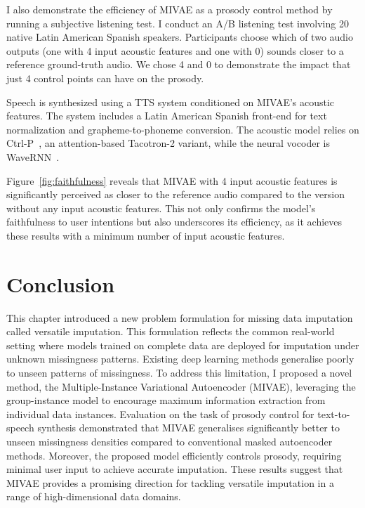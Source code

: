 \documentclass[../thesis.tex]{subfiles}
\begin{document}
I also demonstrate the efficiency of MIVAE as a prosody control method by running a subjective listening test. I conduct an A/B listening test involving 20 native Latin American Spanish speakers. Participants choose which of two audio outputs (one with 4 input acoustic features and one with 0) sounds closer to a reference ground-truth audio. We chose 4 and 0 to demonstrate the impact that just 4 control points can have on the prosody.

Speech is synthesized using a TTS system conditioned on MIVAE's acoustic features. The system includes a Latin American Spanish front-end for text normalization and grapheme-to-phoneme conversion. The acoustic model relies on Ctrl-P~\citep{mohanCtrlPTemporalControl2021}, an attention-based Tacotron-2 variant, while the neural vocoder is WaveRNN~\citep{vandenoordWaveNetGenerativeModel2016}. 

Figure~\ref{fig:faithfulness} reveals that MIVAE with 4 input acoustic features is significantly perceived as closer to the reference audio compared to the version without any input acoustic features. This not only confirms the model's faithfulness to user intentions but also underscores its efficiency, as it achieves these results with a minimum number of input acoustic features.



\section{Conclusion}

This chapter introduced a new problem formulation for missing data imputation called versatile imputation. This formulation reflects the common real-world setting where models trained on complete data are deployed for imputation under unknown missingness patterns. Existing deep learning methods generalise poorly to unseen patterns of missingness. To address this limitation, I proposed a novel method, the Multiple-Instance Variational Autoencoder (MIVAE), leveraging the group-instance model to encourage maximum information extraction from individual data instances. Evaluation on the task of prosody control for text-to-speech synthesis demonstrated that MIVAE generalises significantly better to unseen missingness densities compared to conventional masked autoencoder methods. Moreover, the proposed model efficiently controls prosody, requiring minimal user input to achieve accurate imputation. These results suggest that MIVAE provides a promising direction for tackling versatile imputation in a range of high-dimensional data domains.

\biblio
\end{document}
